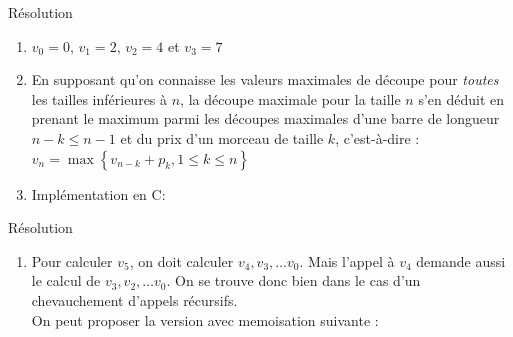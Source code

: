 \documentclass[10pt]{beamer}
\begin{document}
\begin{frame}{\Ctitle}{\stitle}
	\begin{exampleblock}{Résolution}
		\begin{enumerate}
			\item<1-> \textcolor{OliveGreen}{\small $v_0=0$, $v_1=2$, $v_2 = 4$ et $v_3 = 7$ }
			\item<2-> \textcolor{OliveGreen}{\small En supposant qu'on connaisse les valeurs maximales de découpe pour \textit{toutes} les tailles inférieures à $n$, la découpe maximale pour la taille $n$ s'en déduit en prenant le maximum parmi les découpes maximales d'une barre de longueur $n-k \leq n-1$  et du prix d'un morceau de taille $k$, c'est-à-dire :
					$v_n = \max\left\{ v_{n-k} + p_{k},  1 \leq k \leq n\right\}$}
			\item<3-> \textcolor{OliveGreen}{\small Implémentation en C:}
		\end{enumerate}
	\end{exampleblock}
\end{frame}


\begin{frame}{\Ctitle}{\stitle}
	\begin{exampleblock}{Résolution}
		\begin{enumerate}
			\addtocounter{enumi}{3}
			\item Pour calculer $v_5$, on doit calculer $v_4, v_3, \dots v_0$. Mais l'appel à $v_4$ demande aussi le calcul de $v_3, v_2, \dots v_0$. On se trouve donc bien dans le cas d'un chevauchement d'appels récursifs. \\
			      \medskip
			      On peut proposer la version avec memoisation suivante :
		\end{enumerate}
	\end{exampleblock}
\end{frame}
\end{document}

